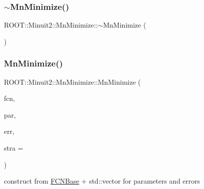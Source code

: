 \subsubsection{\texorpdfstring{$\sim$MnMinimize()}{~MnMinimize()}\hspace{0.1cm}{\footnotesize\ttfamily [1/2]}}
{\footnotesize\ttfamily R\+O\+O\+T\+::\+Minuit2\+::\+Mn\+Minimize\+::$\sim$\+Mn\+Minimize (\begin{DoxyParamCaption}{ }\end{DoxyParamCaption})\hspace{0.3cm}{\ttfamily [inline]}}

\mbox{\label{classROOT_1_1Minuit2_1_1MnMinimize_ab556cdc37be07557d060aa179a7e0d1f}} 
\subsubsection{\texorpdfstring{MnMinimize()}{MnMinimize()}\hspace{0.1cm}{\footnotesize\ttfamily [14/26]}}
{\footnotesize\ttfamily R\+O\+O\+T\+::\+Minuit2\+::\+Mn\+Minimize\+::\+Mn\+Minimize (\begin{DoxyParamCaption}\item[{const \mbox{\hyperlink{classROOT_1_1Minuit2_1_1FCNBase}{F\+C\+N\+Base}} \&}]{fcn,  }\item[{const std\+::vector$<$ double $>$ \&}]{par,  }\item[{const std\+::vector$<$ double $>$ \&}]{err,  }\item[{unsigned int}]{stra = {} }\end{DoxyParamCaption})\hspace{0.3cm}{\ttfamily [inline]}}



construct from \mbox{\hyperlink{classROOT_1_1Minuit2_1_1FCNBase}{F\+C\+N\+Base}} + std\+::vector for parameters and errors 

\mbox{\label{classROOT_1_1Minuit2_1_1MnMinimize_ad6015768309e01c6610185006008b2d5}} 
